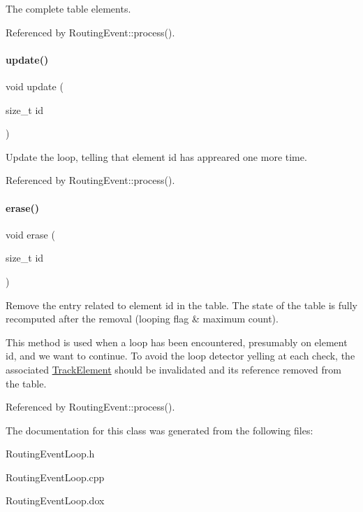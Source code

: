 The complete table elements. 

Referenced by Routing\+Event\+::process().

\mbox{\label{classKite_1_1RoutingEventLoop_ad684b7c05480897bdbd86a5fb8363c72}} 
\paragraph{\texorpdfstring{update()}{update()}}
{\footnotesize\ttfamily void update (\begin{DoxyParamCaption}\item[{size\+\_\+t}]{id }\end{DoxyParamCaption})}

Update the loop, telling that element {\ttfamily id} has appreared one more time. 

Referenced by Routing\+Event\+::process().

\mbox{\label{classKite_1_1RoutingEventLoop_a9b6582ce996327c65bf532396ca11b61}} 
\paragraph{\texorpdfstring{erase()}{erase()}}
{\footnotesize\ttfamily void erase (\begin{DoxyParamCaption}\item[{size\+\_\+t}]{id }\end{DoxyParamCaption})}

Remove the entry related to element {\ttfamily id} in the table. The state of the table is fully recomputed after the removal (looping flag \& maximum count).

This method is used when a loop has been encountered, presumably on element {\ttfamily id}, and we want to continue. To avoid the loop detector yelling at each check, the associated \hyperlink{classKite_1_1TrackElement}{Track\+Element} should be invalidated and it\textquotesingle{}s reference removed from the table. 

Referenced by Routing\+Event\+::process().



The documentation for this class was generated from the following files\+:\begin{DoxyCompactItemize}
\item 
Routing\+Event\+Loop.\+h\item 
Routing\+Event\+Loop.\+cpp\item 
Routing\+Event\+Loop.\+dox\end{DoxyCompactItemize}
